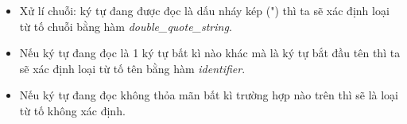 \begin{itemize}

  \item Xử lí chuỗi: ký tự đang được đọc là dấu nháy kép (") thì ta sẽ xác định loại từ tố chuỗi bằng hàm \textit{double\_quote\_string}.


  \item Nếu ký tự đang đọc là 1 ký tự bất kì nào khác mà là ký tự bắt đầu tên thì ta sẽ xác định loại từ tố tên bằng hàm \textit{identifier}.


  \item Nếu ký tự đang đọc không thỏa mãn bất kì trường hợp nào trên thì sẽ là loại từ tố không xác định.
\end{itemize}


